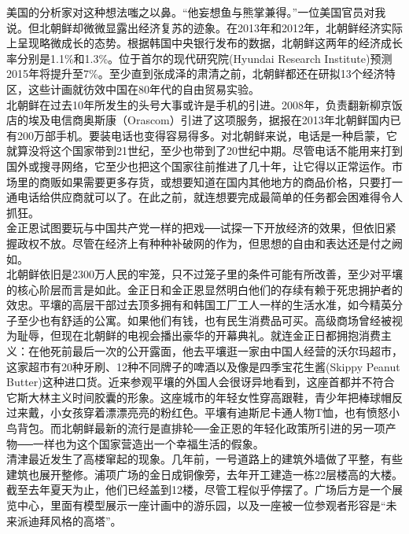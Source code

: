 美国的分析家对这种想法嗤之以鼻。“他妄想鱼与熊掌兼得。”一位美国官员对我说。但北朝鲜却微微显露出经济复苏的迹象。在2013年和2012年，北朝鲜经济实际上呈现略微成长的态势。根据韩国中央银行发布的数据，北朝鲜这两年的经济成长率分别是1.1\%和1.3\%。位于首尔的现代研究院(Hyundai Research Institute)预测2015年将提升至7\%。至少直到张成泽的肃清之前，北朝鲜都还在研拟13个经济特区，这些计画就彷效中国在80年代的自由贸易实验。\\

北朝鲜在过去10年所发生的头号大事或许是手机的引进。2008年，负责翻新柳京饭店的埃及电信商奥斯康（Orascom）引进了这项服务，据报在2013年北朝鲜国内已有200万部手机。要装电话也变得容易得多。对北朝鲜来说，电话是一种启蒙，它就算没将这个国家带到21世纪，至少也带到了20世纪中期。尽管电话不能用来打到国外或搜寻网络，它至少也把这个国家往前推进了几十年，让它得以正常运作。市场里的商贩如果需要更多存货，或想要知道在国内其他地方的商品价格，只要打一通电话给供应商就可以了。在此之前，就连想要完成最简单的任务都会困难得令人抓狂。\\

金正恩试图要玩与中国共产党一样的把戏──试探一下开放经济的效果，但依旧紧握政权不放。尽管在经济上有种种补破网的作为，但思想的自由和表达还是付之阙如。\\

北朝鲜依旧是2300万人民的牢笼，只不过笼子里的条件可能有所改善，至少对平壤的核心阶层而言是如此。金正日和金正恩显然明白他们的存续有赖于死忠拥护者的效忠。平壤的高层干部过去顶多拥有和韩国工厂工人一样的生活水准，如今精英分子至少也有舒适的公寓。如果他们有钱，也有民生消费品可买。高级商场曾经被视为耻辱，但现在北朝鲜的电视会播出豪华的开幕典礼。就连金正日都拥抱消费主义：在他死前最后一次的公开露面，他去平壤逛一家由中国人经营的沃尔玛超市，这家超市有20种牙刷、12种不同牌子的啤酒以及像是四季宝花生酱(Skippy Peanut Butter)这种进口货。近来参观平壤的外国人会很讶异地看到，这座首都并不符合它斯大林主义时间胶囊的形象。这座城市的年轻女性穿高跟鞋，青少年把棒球帽反过来戴，小女孩穿着漂漂亮亮的粉红色。平壤有迪斯尼卡通人物T恤，也有愤怒小鸟背包。而北朝鲜最新的流行是直排轮──金正恩的年轻化政策所引进的另一项产物──一样也为这个国家营造出一个幸福生活的假象。\\

清津最近发生了高楼窜起的现象。几年前，一号道路上的建筑外墙做了平整，有些建筑也展开整修。浦项广场的金日成铜像旁，去年开工建造一栋22层楼高的大楼。截至去年夏天为止，他们已经盖到12楼，尽管工程似乎停摆了。广场后方是一个展览中心，里面有模型展示一座计画中的游乐园，以及一座被一位参观者形容是“未来派迪拜风格的高塔”。\\

